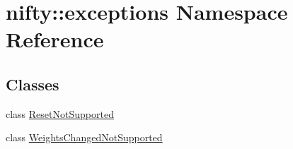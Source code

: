 \hypertarget{namespacenifty_1_1exceptions}{}\section{nifty\+:\+:exceptions Namespace Reference}
\label{namespacenifty_1_1exceptions}
\subsection*{Classes}
\begin{DoxyCompactItemize}
\item 
class \hyperlink{classnifty_1_1exceptions_1_1ResetNotSupported}{Reset\+Not\+Supported}
\item 
class \hyperlink{classnifty_1_1exceptions_1_1WeightsChangedNotSupported}{Weights\+Changed\+Not\+Supported}
\end{DoxyCompactItemize}
